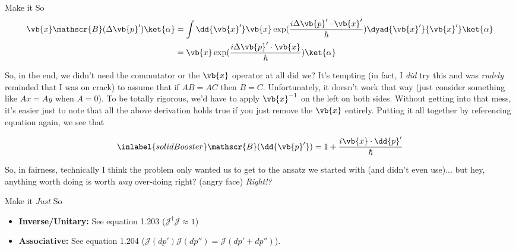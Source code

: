 \begin{answer}
\begin{answerpart}{Make it So}
    \begin{equation}
      \begin{alignedat}{2}
        && \vb{x}\mathscr{B}(\Delta \vb{p}')\ket{\alpha}
        &=
        \int \dd{\vb{x}'}
        \vb{x}
        \exp(\frac{i\Delta \vb{p}' \cdot \vb{x}'}{\hbar})
        \dyad{\vb{x}'}{\vb{x}'}
        \ket{\alpha}
        \\
        &&&=
        \vb{x}
        \exp(\frac{i\Delta \vb{p}' \cdot \vb{x}}{\hbar})
        \ket{\alpha}
        \\
      \end{alignedat}
    \end{equation}

    So, in the end, we didn't need the commutator or the $\vb{x}$
    operator at all did we?  It's tempting (in fact, I \emph{did} try
    this and was \emph{rudely} reminded that I was on crack) to assume
    that if $AB = AC$ then $B = C$.  Unfortunately, it doesn't work
    that way (just consider something like $Ax = Ay$ when $A = 0$).
    To be totally rigorous, we'd have to apply $\vb{x}^{-1}$ on the left
    on both sides.  Without getting into that mess, it's easier just
    to note that all the above derivation holds true if you just
    remove the $\vb{x}$ entirely.  Putting it all together by
    referencing equation  again, we see that

    \begin{equation}
      \inlabel{solidBooster}
      \mathscr{B}(\dd{\vb{p}'}) = 1 + \frac{i\vb{x} \cdot \dd{p}'}{\hbar}
    \end{equation}

    So, in fairness, technically I think the problem only wanted us to
    get to the ansatz we started with (and didn't even use)... but
    hey, anything worth doing is worth \emph{way} over-doing right?
    (angry face) \emph{Right!?}
  \end{answerpart}

  \begin{answerpart}{\texorpdfstring{Make it \emph{Just} So}{Make it Just So}}
    \begin{itemize}
    \item \textbf{Inverse/Unitary:} See equation 1.203
      ($\mathscr{J}^\dagger\mathscr{J} \approx 1$)

    \item \textbf{Associative:} See equation 1.204
      ($\mathscr{J}(dp')\mathscr{J}(dp'') = \mathscr{J}(dp' + dp'')$).
    \end{itemize}


\end{answerpart}
\end{answer}

